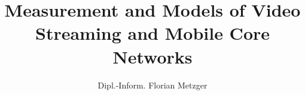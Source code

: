 
\title{Measurement and Models of Video Streaming and Mobile Core Networks}
\author{Dipl.-Inform. Florian Metzger}